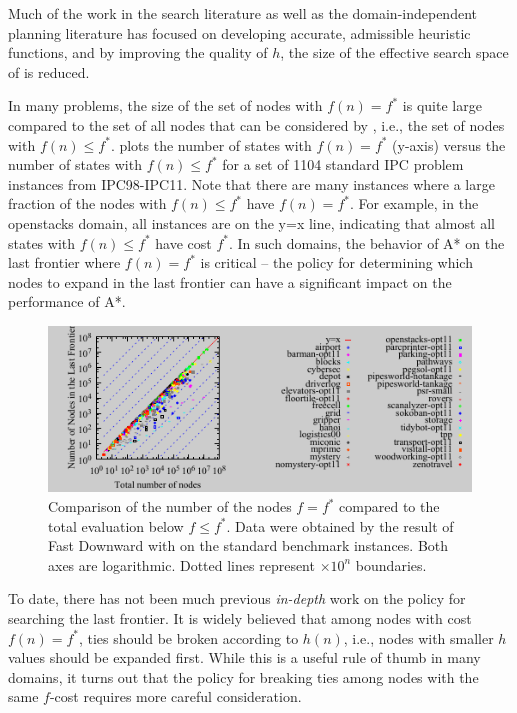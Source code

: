 Much of the work in the search literature as well as the domain-independent planning literature has focused on developing accurate, admissible heuristic functions, and 
by improving the quality of $h$, the size of the effective search space of \astar is reduced.


In many problems, the size of the set of nodes with $f(n)=f^*$
is quite large compared to the set of all nodes that can be considered by \astar, i.e., the set of nodes with $f(n) \leq f^*$.
 plots the number of states with $f(n) = f^*$ (y-axis)
versus the number of states with $f(n) \leq f^*$
for a set of 1104 standard IPC problem instances from IPC98-IPC11.
Note that there are many instances where a large fraction of the nodes with $f(n) \leq f^*$ have $f(n)=f^*$.
For example, in the openstacks domain, all instances are on the y=x line, indicating that almost all states with $f(n) \leq f^*$ have cost $f^*$.
In such domains, the behavior of A* on the last frontier where $f(n)=f^*$ is critical -- the policy for determining which nodes to expand in the last frontier can have a significant impact on the performance of A*.

\begin{figure}[htb]
 \centering {}
 \includegraphics{tables/aaai16-frontier/aaai16-lmcut_frontier_noh-front-vs-expanded.pdf}
 \caption{
 Comparison of the number of the nodes $f=f^*$ compared to the
 total evaluation below $f\leq f^*$. Data were obtained by the result of
 Fast Downward with \lmcut on the standard benchmark instances. Both axes are
 logarithmic. Dotted lines represent $\times 10^n$ boundaries.}  \label{fig:plateau-noh}
\end{figure}

To date, there has not been much previous \emph{in-depth} work on the policy for searching the last frontier.
It is widely believed that among nodes with cost $f(n) = f^*$, ties should be broken according to $h(n)$, i.e., nodes with smaller $h$ values should be expanded first.
While this is a useful rule of thumb in many domains,
it turns out that the policy for breaking ties among nodes with the same $f$-cost requires more careful consideration.

